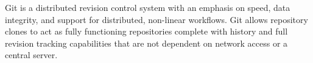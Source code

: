 Git is a distributed revision control system with an emphasis on speed, data
integrity, and support for distributed, non-linear workflows.  Git allows
repository clones to act as fully functioning repositories complete with history
and full revision tracking capabilities that are not dependent on network access
or a central server.
